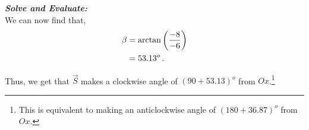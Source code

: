 \begin{subquestions}
\begin{subsubquestions}
\textbf{\textit{Solve and Evaluate:}} \\
We can now find that,
\begin{align}
	\beta & = \arctan\left(\frac{-8}{-6}\right) \nonumber \\
	      & = 53.13^o \,.
\end{align}

Thus, we get that $\vec{S}$ makes a clockwise angle of $(90+53.13)^o$ from $Ox$.\footnote{This is equivalent to making an anticlockwise angle of $(180+36.87)^o$ from $Ox$.}\\



\end{subsubquestions}


\end{subquestions}